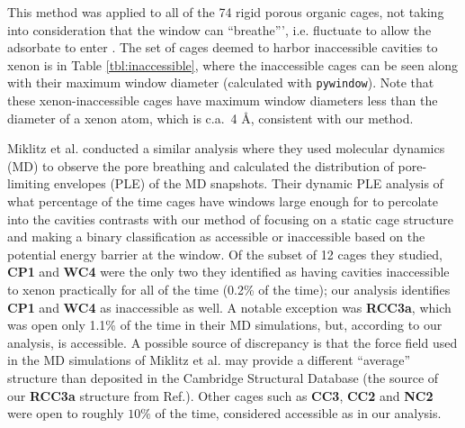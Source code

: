 \documentclass[journal=jacsat,manuscript=article]{achemso}
\begin{document}
This method was applied to all of the 74 rigid porous organic cages, not taking into consideration that the window can ``breathe''', i.e. fluctuate to allow the adsorbate to enter \cite{miklitz2017computational}. The set of cages deemed to harbor inaccessible cavities to xenon is in Table \ref{tbl:inaccessible}, where the inaccessible cages can be seen along with their maximum window diameter (calculated with \texttt{pywindow}). Note that these xenon-inaccessible cages have maximum window diameters less than the diameter of a xenon atom, which is c.a.\ 4 \AA, consistent with our method. 

Miklitz et al.\cite{miklitz2017computational} conducted a similar analysis where they used molecular dynamics (MD) to observe the pore breathing and calculated the distribution of pore-limiting envelopes (PLE) of the MD snapshots. Their dynamic PLE analysis of what percentage of the time cages have windows large enough for  to percolate into the cavities contrasts with our method of focusing on a static cage structure and making a binary classification as accessible or inaccessible based on the potential energy barrier at the window. Of the subset of 12 cages they studied, \textbf{CP1} and \textbf{WC4} were the only two they identified as having cavities inaccessible to xenon practically for all of the time (0.2\% of the time); our analysis identifies \textbf{CP1} and \textbf{WC4} as inaccessible as well. A notable exception was \textbf{RCC3a}, which was open only 1.1\% of the time in their MD simulations, but, according to our analysis, is accessible. A possible source of discrepancy is that the force field used in the MD simulations of Miklitz et al.\cite{miklitz2017computational} may provide a different ``average'' structure than deposited in the Cambridge Structural Database (the source of our \textbf{RCC3a} structure from Ref.\cite{miklitz2017computational}). Other cages such as \textbf{CC3}, \textbf{CC2} and \textbf{NC2} were open to  roughly $10 \%$ of the time, considered accessible as in our analysis. 
\end{document}
